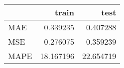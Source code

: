 \begin{tabular}{lrr}
\toprule
{} &      train &       test \\
\midrule
MAE  &   0.339235 &   0.407288 \\
MSE  &   0.276075 &   0.359239 \\
MAPE &  18.167196 &  22.654719 \\
\bottomrule
\end{tabular}
